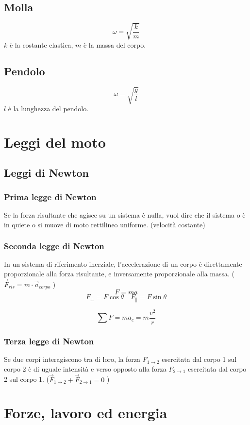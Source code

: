 \documentclass[a4paper]{article}
\theoremstyle{break}
\theoremstyle{break}
\theoremstyle{break}
\theoremstyle{break}
\begin{document}
\subsection{Molla}
\[
  \omega = \sqrt{\frac{k}{m}}
\] 
\( k \) è la costante elastica, \( m \) è la massa del corpo. 

\subsection{Pendolo}
\[
  \omega = \sqrt{\frac{g}{l}}
\]
\( l \) è la lunghezza del pendolo.

\section{Leggi del moto}
\subsection{Leggi di Newton}
\subsubsection{Prima legge di Newton}
Se la forza risultante che agisce su un sistema è nulla, vuol dire che il sistema o è in quiete o si muove
di moto rettilineo uniforme. (velocità costante)

\subsubsection{Seconda legge di Newton}
In un sistema di riferimento inerziale, l’accelerazione di un corpo è direttamente proporzionale alla
forza risultante, e inversamente proporzionale alla massa. (\( \vec{F}_{ris} = m \cdot \vec{a}_{corpo} \) )
\[
F = m a
\] 
\[
  F_{\perp} = F \cos \theta \quad F_{\parallel} = F \sin \theta
\] 

\[
  \sum F = m a_c = m \frac{v^2}{r}
\] 

\subsubsection{Terza legge di Newton}
Se due corpi interagiscono tra di loro, la forza \( F_{1 \to 2} \) esercitata dal corpo 1 sul corpo 2 è di uguale
intensità e verso opposto alla forza \( F_{2 \to 1} \) esercitata dal corpo 2 sul corpo 1.
(\( \vec{F}_{1 \to 2} + \vec{F}_{2 \to 1} = 0 \) )


\section{Forze, lavoro ed energia}
\end{document}
